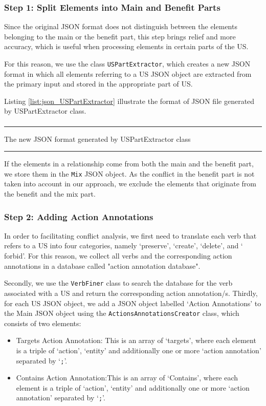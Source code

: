 \subsubsection*{Step 1: Split Elements into Main and Benefit Parts}\label{conflict_design_step_1}
Since the original JSON format does not distinguish between the elements belonging to the main or the benefit part, this step brings relief and more accuracy, which is useful when processing elements in certain parts of the US.

For this reason, we use the class \texttt{USPartExtractor}, which creates a new JSON format in which all elements referring to a US JSON object are extracted from the primary input and stored in the appropriate part of US.

Listing \ref{list:json_USPartExtractor} illustrate the format of JSON file generated by USPartExtractor class.
\begin{MyListing}
	\paragraph{}
	\hrule
	\centering
	
	\caption{The new JSON format generated by USPartExtractor class}\label{list:json_USPartExtractor}
	\hrule
\end{MyListing}
If the elements in a relationship come from both the main and the benefit part, we store them in the \texttt{Mix} JSON object. As the conflict in the benefit part is not taken into account in our approach, we exclude the elements that originate from the benefit and the mix part.
\subsubsection*{Step 2: Adding Action Annotations}
In order to facilitating conflict analysis, we first need to translate each verb that refers to a US into four categories, namely ‘preserve’, ‘create’, ‘delete’, and ‘ forbid’. For this reason, we collect all verbs and the corresponding action annotations in a database called "action annotation database".

Secondly, we use the \texttt{VerbFiner} class to search the database for the verb associated with a US and return the corresponding action annotation/s. Thirdly, for each US JSON object, we add a JSON object labelled ‘Action Annotations’ to the Main JSON object using the \texttt{ActionsAnnotationsCreator} class, which consists of two elements:
\begin{itemize}
	\item Targets Action Annotation: This is an array of ‘targets’, where each element is a triple of ‘action’, ‘entity’ and additionally one or more ‘action annotation’ separated by ‘\texttt{;}’.
	
	\item Contains Action Annotation:This is an array of ‘Contains’, where each element is a triple of ‘action’, ‘entity’ and additionally one or more ‘action annotation’ separated by ‘\texttt{;}’.
\end{itemize}

